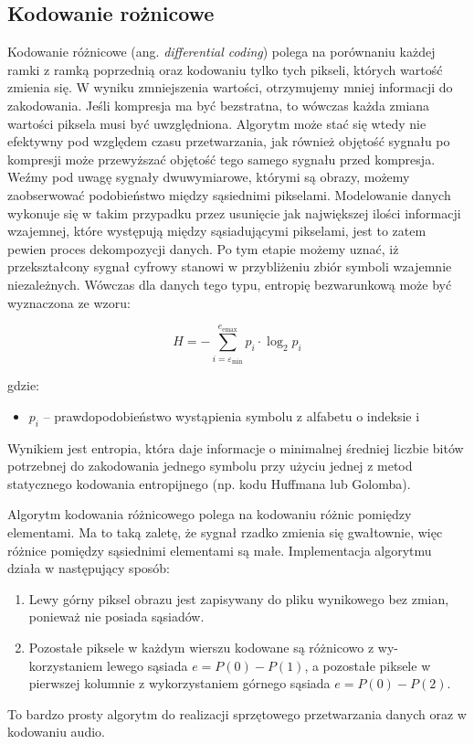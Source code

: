 \documentclass{article}
\begin{document}
\subsection{Kodowanie rożnicowe}
\label{sec:roznicowe}

Kodowanie różnicowe (ang. \emph{differential coding}) polega na porównaniu każdej ramki z ramką
poprzednią oraz kodowaniu tylko tych pikseli, których wartość zmienia się. W wyniku
zmniejszenia wartości, otrzymujemy mniej informacji do zakodowania. Jeśli kompresja ma
być bezstratna, to wówczas każda zmiana wartości piksela musi być uwzględniona. Algorytm może stać się wtedy nie efektywny pod względem czasu przetwarzania, jak również objętość sygnału po kompresji może przewyższać objętość tego samego sygnału przed kompresja.  Weźmy pod uwagę sygnały dwuwymiarowe, którymi są obrazy, możemy zaobserwować podobieństwo między sąsiednimi pikselami. Modelowanie danych wykonuje się w takim przypadku przez usunięcie jak największej ilości informacji wzajemnej, które występują między sąsiadującymi pikselami, jest to zatem pewien proces dekompozycji danych. Po tym etapie możemy uznać, iż przekształcony sygnał cyfrowy stanowi w przybliżeniu zbiór symboli wzajemnie niezależnych. Wówczas dla danych tego typu, entropię bezwarunkową może być wyznaczona ze wzoru:

\begin{equation}
    \label{eq:entropia}
    H = -\sum_{i=\varepsilon_{\textrm{min}}}^{e_{\textrm{emax}}} p_{i} \cdot \log_{2} p_{i}
\end{equation}

gdzie:
\begin{itemize}[label=]
 \item $p_i$ -- prawdopodobieństwo wystąpienia symbolu z alfabetu o indeksie i
\end{itemize}

Wynikiem jest entropia, która daje informacje o minimalnej średniej liczbie bitów potrzebnej do zakodowania jednego symbolu przy użyciu jednej z metod statycznego kodowania entropijnego (np. kodu Huffmana lub Golomba).

Algorytm kodowania różnicowego polega na kodowaniu różnic pomiędzy elementami. Ma to taką zaletę, że sygnał rzadko zmienia się gwałtownie, więc różnice pomiędzy sąsiednimi elementami są małe. Implementacja algorytmu działa w następujący sposób:

\begin{enumerate}
 \item Lewy górny piksel obrazu jest zapisywany do pliku wynikowego bez zmian, ponieważ nie posiada sąsiadów.
 \item Pozostałe piksele w każdym wierszu kodowane są różnicowo z wy-korzystaniem lewego sąsiada $e = P(0) - P(1)$, a pozostałe piksele w pierwszej kolumnie z wykorzystaniem górnego sąsiada $e = P(0) - P(2)$.
\end{enumerate}
To bardzo prosty algorytm do realizacji sprzętowego przetwarzania danych oraz w kodowaniu audio.
\end{document}
